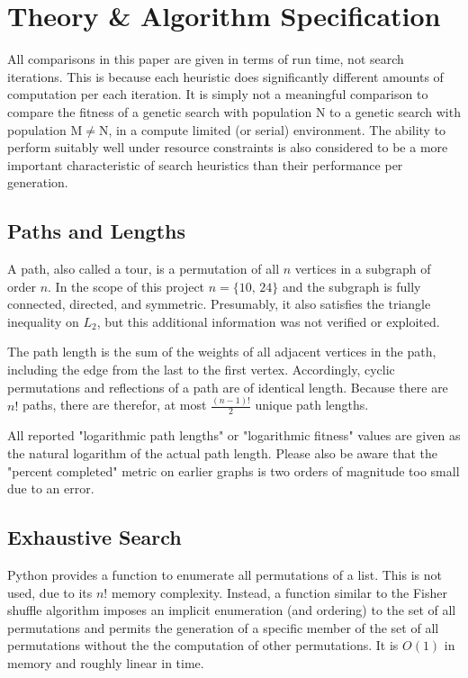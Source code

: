 \documentclass[10pt, conference, compsocconf]{IEEEtran}
\begin{document}
\section{Theory \& Algorithm Specification}
All comparisons in this paper are given in terms of run time, not search iterations. This is because each heuristic does significantly different amounts of computation per each iteration. It is simply not a meaningful comparison to compare the fitness of a genetic search with population N to a genetic search with population M$\neq$N, in a compute limited (or serial) environment. The ability to perform suitably well under resource constraints is also considered to be a more important characteristic of search heuristics than their performance per generation.

\subsection{Paths and Lengths}
A path, also called a tour, is a permutation of all $n$ vertices in a subgraph of order $n$. In the scope of this project $n=\{10,\,24\}$ and the subgraph is fully connected, directed, and symmetric. Presumably, it also satisfies the triangle inequality on $L_2$, but this additional information was not verified or exploited. 

The path length is the sum of the weights of all adjacent vertices in the path, including the edge from the last to the first vertex. Accordingly, cyclic permutations and reflections of a path are of identical length. Because there are $n!$ paths, there are therefor, at most $\frac{(n-1)!}{2}$ unique path lengths.

All reported "logarithmic path lengths" or "logarithmic fitness" values are given as the natural logarithm of the actual path length. Please also be aware that the "percent completed" metric on earlier graphs is two orders of magnitude too small due to an error.

\subsection{Exhaustive Search}
Python provides a function to enumerate all permutations of a list. This is not used, due to its $n!$ memory complexity. Instead, a function similar to the Fisher shuffle algorithm imposes an implicit enumeration (and ordering) to the set of all permutations and permits the generation of a specific member of the set of all permutations without the the computation of other permutations. It is $O(1)$ in memory and roughly linear in time.
\end{document}
